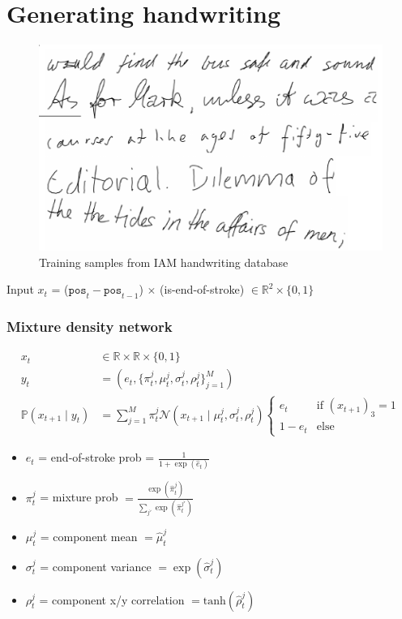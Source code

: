 \documentclass[10pt,xcolor=dvipsnames]{beamer}
\begin{document}
\section{Generating handwriting}
\begin{frame}
  \begin{figure}
    \centering
  \includegraphics[width=.75\linewidth]{fig/fig9.png}
    \caption{Training samples from IAM handwriting database}
    \label{fig:fig9}
  \end{figure}
Input $x_t$ = ($\texttt{pos}_t - \texttt{pos}_{t-1}$) $\times$
(is-end-of-stroke) $ \in \mathbb{R}^2 \times \{0,1\}$
\end{frame}

\begin{frame}
  \frametitle{Mixture density network}
  \begin{align*}
   x_t &\in \mathbb{R} \times \mathbb{R} \times \{0,1\}  \\
    y_t &= (e_t, \{\pi^j_t, \mu^j_t, \sigma^j_t, \rho^j_t\}_{j=1}^M) \\
    \mathbb{P}(x_{t+1} \mid y_t) &= \sum_{j=1}^M \pi^j_t \mathcal{N}(x_{t+1} \mid \mu^j_t, \sigma^j_t, \rho^j_t)
    \begin{cases}
      e_t & \text{if } (x_{t+1})_3 = 1 \\
      1-e_t & \text{else}
    \end{cases}
  \end{align*}

  \begin{itemize}
  \item $e_t$ = end-of-stroke prob = $\frac1{1+\exp(\hat{e}_t)}$
  \item $\pi^j_t$ = mixture prob $= \frac{\exp(\hat{\pi}_t^j)}{\sum_{j'}\exp(\hat{\pi}_t^{j'})}$
  \item $\mu^j_t$ = component mean $= \hat{\mu}^j_t$
  \item $\sigma^j_t$ = component variance $= \exp(\hat{\sigma}_t^j)$
  \item $\rho^j_t$ = component x/y correlation $= \text{tanh}(\hat{\rho}^j_t)$
  \end{itemize}
\end{frame}
\end{document}

